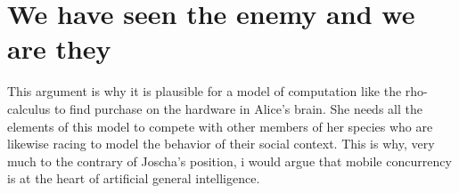 \documentclass[runningheads]{llncs}
\begin{document}
\vspace{1\baselineskip}
\section{We have seen the enemy and we are they}

This argument is why it is plausible for a model of computation like the rho-calculus to find purchase on the hardware in Alice’s brain. She needs all the elements of this model to compete with other members of her species who are likewise racing to model the behavior of their social context. This is why, very much to the contrary of Joscha’s position, i would argue that mobile concurrency is at the heart of artificial general intelligence.

   

\end{document}
